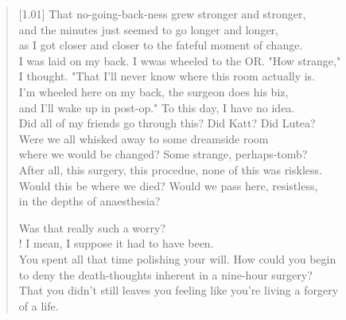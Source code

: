 \begin{verse}[1.01\textwidth]
  That no-going-back-ness grew stronger and stronger,\\
  and the minutes just seemed to go longer and longer,\\
  as I got closer and closer to the fateful moment of change.\\
  I was laid on my back. I wwas wheeled to the OR. "How strange,"\\
  I thought. "That I'll never know where this room actually is.\\
  I'm wheeled here on my back, the surgeon does his biz,\\
  and I'll wake up in post-op." To this day, I have no idea.\\
  Did all of my friends go through this? Did Katt? Did Lutea?\\
  Were we all whisked away to some dreamside room\\
  where we would be changed? Some strange, perhaps-tomb?\\
  After all, this surgery, this procedue, none of this was riskless.\\
  Would this be where we died? Would we pass here, resistless,\\
  in the depths of anaesthesia?

  \begin{ally}
    \noindent Was that really such a worry?\\!
  \noindent {} I mean, I suppose it had to have been.\\
  \noindent You spent all that time polishing your will. How could you begin\\
  \noindent to deny the death-thoughts inherent in a nine-hour surgery?\\
  \noindent That you didn't still leaves you feeling like you're living a forgery\\
  \noindent of a life.
\end{ally}


\end{verse}
